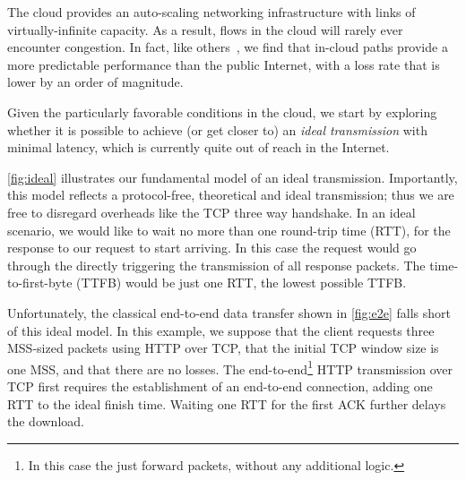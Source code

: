 
The cloud provides an auto-scaling networking infrastructure with links of virtually-infinite capacity. As a result, flows in the cloud will rarely ever encounter congestion. In fact, like others~\cite{haq2017measuring}, we find that in-cloud paths provide a more predictable performance than the public Internet, with a loss rate that is lower by an order of magnitude. 

Given the particularly favorable conditions in the cloud, we start by exploring whether it is possible to achieve (or get closer to) an \textit{ideal transmission} with minimal latency, which is currently quite out of reach in the Internet. 

 \autoref{fig:ideal} illustrates our fundamental model of an ideal transmission. Importantly, this model reflects a protocol-free, theoretical and ideal transmission; thus we are free to disregard overheads like the TCP three way handshake. In an ideal scenario, we would like to wait no more than one round-trip time (RTT), for the response to our request to start arriving. In this case the request would go through the \relays directly triggering the transmission of all response packets. The time-to-first-byte (TTFB) would be just one RTT, the lowest possible TTFB.

 Unfortunately, the classical end-to-end data transfer shown in \autoref{fig:e2e} falls short of this ideal model. In this example, we suppose that the client requests three MSS-sized packets using HTTP over TCP, that the initial TCP window size is one MSS, and that there are no losses. The end-to-end\footnote{In this case the \relays just forward packets, without any additional logic.} HTTP transmission over TCP first requires the establishment of an end-to-end connection, adding one RTT to the ideal finish time. Waiting one RTT for the first ACK further delays the download.

